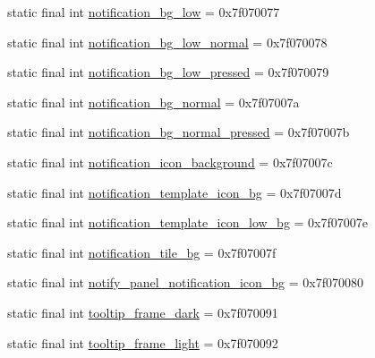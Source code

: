 \begin{DoxyCompactItemize}
\item 
static final int \mbox{\hyperlink{classcom_1_1synnapps_1_1carouselview_1_1_r_1_1drawable_a00599c47f0368da0323210e07ecce7e3}{notification\+\_\+bg\+\_\+low}} = 0x7f070077
\item 
static final int \mbox{\hyperlink{classcom_1_1synnapps_1_1carouselview_1_1_r_1_1drawable_ae387329dc1dd1aaa2c5a0e308a20fad7}{notification\+\_\+bg\+\_\+low\+\_\+normal}} = 0x7f070078
\item 
static final int \mbox{\hyperlink{classcom_1_1synnapps_1_1carouselview_1_1_r_1_1drawable_a38c88fd288feedc6c68643921327c875}{notification\+\_\+bg\+\_\+low\+\_\+pressed}} = 0x7f070079
\item 
static final int \mbox{\hyperlink{classcom_1_1synnapps_1_1carouselview_1_1_r_1_1drawable_a25375abba4e9859cd44cee40c3a3d6e2}{notification\+\_\+bg\+\_\+normal}} = 0x7f07007a
\item 
static final int \mbox{\hyperlink{classcom_1_1synnapps_1_1carouselview_1_1_r_1_1drawable_aaf0db1dafc34fe678c7aecc03235d7b2}{notification\+\_\+bg\+\_\+normal\+\_\+pressed}} = 0x7f07007b
\item 
static final int \mbox{\hyperlink{classcom_1_1synnapps_1_1carouselview_1_1_r_1_1drawable_a381693a734647b19bec5c73c8ce284e5}{notification\+\_\+icon\+\_\+background}} = 0x7f07007c
\item 
static final int \mbox{\hyperlink{classcom_1_1synnapps_1_1carouselview_1_1_r_1_1drawable_a46daa4d7dafe35fdafb4b75d0190d285}{notification\+\_\+template\+\_\+icon\+\_\+bg}} = 0x7f07007d
\item 
static final int \mbox{\hyperlink{classcom_1_1synnapps_1_1carouselview_1_1_r_1_1drawable_ab40a3f791dbde60bbccb6dd2fcdc5418}{notification\+\_\+template\+\_\+icon\+\_\+low\+\_\+bg}} = 0x7f07007e
\item 
static final int \mbox{\hyperlink{classcom_1_1synnapps_1_1carouselview_1_1_r_1_1drawable_a89d985d8a422f46f14641c2f3ae04604}{notification\+\_\+tile\+\_\+bg}} = 0x7f07007f
\item 
static final int \mbox{\hyperlink{classcom_1_1synnapps_1_1carouselview_1_1_r_1_1drawable_a409d0ff0e319cc0345120b0dfe91e3cb}{notify\+\_\+panel\+\_\+notification\+\_\+icon\+\_\+bg}} = 0x7f070080
\item 
static final int \mbox{\hyperlink{classcom_1_1synnapps_1_1carouselview_1_1_r_1_1drawable_a559d1857e8cd5c2f4c263fd9b964863c}{tooltip\+\_\+frame\+\_\+dark}} = 0x7f070091
\item 
static final int \mbox{\hyperlink{classcom_1_1synnapps_1_1carouselview_1_1_r_1_1drawable_a78fe30cf04c463f9c93e80544eba061f}{tooltip\+\_\+frame\+\_\+light}} = 0x7f070092
\end{DoxyCompactItemize}
